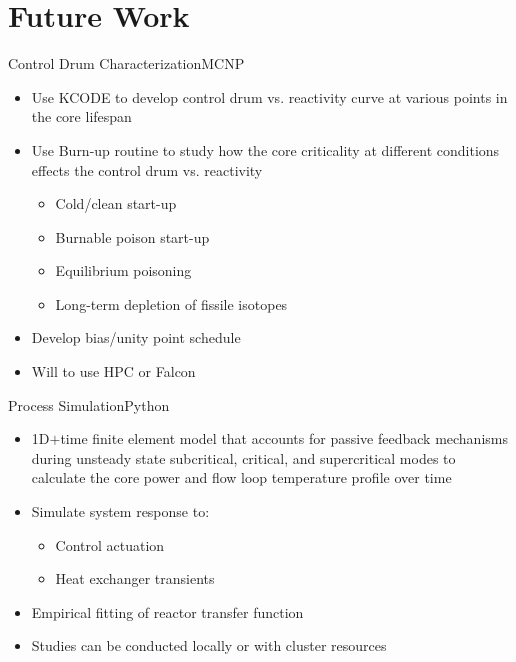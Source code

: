 \documentclass[aspectratio=1610,pdftex,dvipsnames]{beamer}
\begin{document}
\section{Future Work}

\begin{frame}{Control Drum Characterization}{MCNP}
    \begin{itemize}
        \item Use KCODE to develop control drum vs. reactivity curve at various points in the core lifespan
        \item Use Burn-up routine to study how the core criticality at different conditions effects the control drum vs. reactivity
        \begin{itemize}
            \item Cold/clean start-up
            \item Burnable poison start-up
            \item Equilibrium poisoning
            \item Long-term depletion of fissile isotopes
        \end{itemize} 
        \item Develop bias/unity point schedule 
        \item Will to use HPC or Falcon
    \end{itemize}
\end{frame}

\begin{frame}{Process Simulation}{Python}
    \begin{itemize}
        \item 1D$+$time finite element model that accounts for passive feedback mechanisms during unsteady state subcritical, critical, and supercritical modes to calculate the core power and flow loop temperature profile over time
        \item Simulate system response to:
        \begin{itemize}
            \item Control actuation
            \item Heat exchanger transients
        \end{itemize}
        \item Empirical fitting of reactor transfer function
        \item Studies can be conducted locally or with cluster resources
    \end{itemize}
\end{frame}
\end{document}
